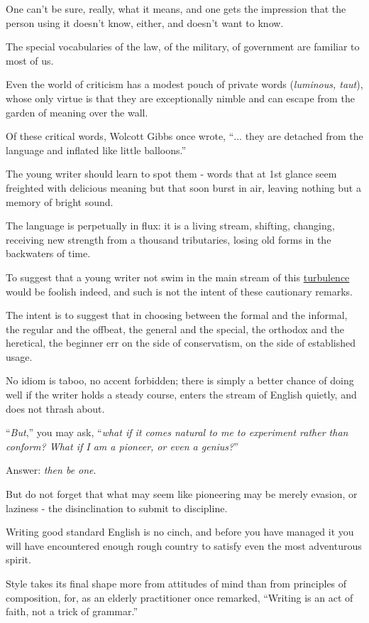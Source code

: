 \documentclass{book}
\numberwithin{equation}{section}
\begin{document}
One can't be sure, really, what it means, and one gets the impression that the person using it doesn't know, either, and doesn't want to know.

%
The special vocabularies of the law, of the military, of government are familiar to most of us.

Even the world of criticism has a modest pouch of private words (\textit{luminous, taut}), whose only virtue is that they are exceptionally nimble and can escape from the garden of meaning over the wall.

Of these critical words, Wolcott Gibbs once wrote, ``$\ldots$ they are detached from the language and inflated like little balloons.''

The young writer should learn to spot them - words that at 1st glance seem freighted with delicious meaning but that soon burst in air, leaving nothing but a memory of bright sound.

%
The language is perpetually in flux: it is a living stream, shifting, changing, receiving new strength from a thousand tributaries, losing old forms in the backwaters of time.

To suggest that a young writer not swim in the main stream of this \underline{turbulence} would be foolish indeed, and such is not the intent of these cautionary remarks.

The intent is to suggest that in choosing between the formal and the informal, the regular and the offbeat, the general and the special, the orthodox and the heretical, the beginner err on the side of conservatism, on the side of established usage.

No idiom is taboo, no accent forbidden; there is simply a better chance of doing well if the writer holds a steady course, enters the stream of English quietly, and does not thrash about.

%
``\textit{But},'' you may ask, ``\textit{what if it comes natural to me to experiment rather than conform? What if I am a pioneer, or even a genius?}''

Answer: \textit{then be one}.

But do not forget that what may seem like pioneering may be merely evasion, or laziness - the disinclination to submit to discipline.

Writing good standard English is no cinch, and before you have managed it you will have encountered enough rough country to satisfy even the most adventurous spirit.

%
Style takes its final shape more from attitudes of mind than from principles of composition, for, as an elderly practitioner once remarked, ``Writing is an act of faith, not a trick of grammar.''
\end{document}

